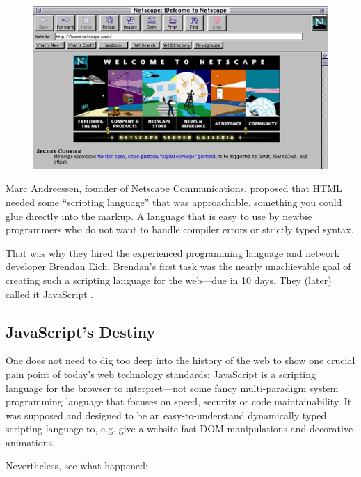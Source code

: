 \documentclass[10pt]{article}
\begin{document}
\begin{sloppypar}
  \begin{figure}[ht]
    \centering
    \includegraphics[width=\textwidth]{figures/netscape.jpg}
    \label{fig:netscape}
  \end{figure}

  Marc Andreessen, founder of Netscape Communications, proposed that HTML needed some “scripting language” that was approachable, something you could glue directly into the markup. A language that is easy to use by newbie programmers who do not want to handle compiler errors or strictly typed syntax.

  That was why they hired the experienced programming language and network developer Brendan Eich. Brendan’s first task was the nearly unachievable goal of creating such a scripting language for the web—due in 10 days. They (later) called it JavaScript \citep{severance_javascript_2012}.

  \subsection{JavaScript’s Destiny}
  \label{sec:javascript-destiny}

  One does not need to dig too deep into the history of the web to show one crucial pain point of today’s web technology standards: JavaScript is a scripting language for the browser to interpret—not some fancy multi-paradigm system programming language that focuses on speed, security or code maintainability. It was supposed and designed to be an easy-to-understand dynamically typed scripting language to, e.g. give a website fast DOM manipulations and decorative animations.

  Nevertheless, see what happened:


\end{sloppypar}
\end{document}
